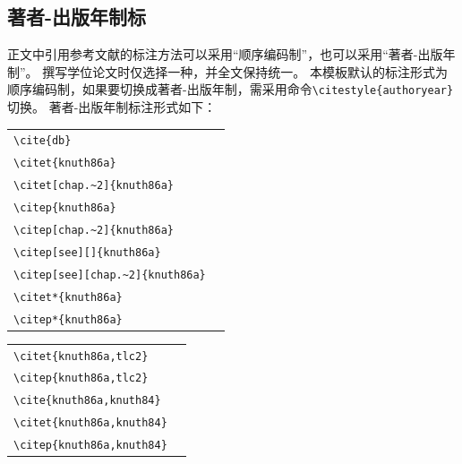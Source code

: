 \subsection{著者-出版年制标}
正文中引用参考文献的标注方法可以采用“顺序编码制”，也可以采用“著者-出版年制”。
撰写学位论文时仅选择一种，并全文保持统一。
本模板默认的标注形式为顺序编码制，如果要切换成著者-出版年制，需采用命令\verb|\citestyle{authoryear}|切换。
著者-出版年制标注形式如下：

\noindent
\begin{tabular}{l@{\quad$\Rightarrow$\quad}l}
  \verb|\cite{db}| & \cite{db}\\
  \verb|\citet{knuth86a}| & \citet{knuth86a}\\
  \verb|\citet[chap.~2]{knuth86a}| & \citet[chap.~2]{knuth86a}\\[0.5ex]
  \verb|\citep{knuth86a}| & \citep{knuth86a}\\
  \verb|\citep[chap.~2]{knuth86a}| & \citep[chap.~2]{knuth86a}\\
  \verb|\citep[see][]{knuth86a}| & \citep[see][]{knuth86a}\\
  \verb|\citep[see][chap.~2]{knuth86a}| & \citep[see][chap.~2]{knuth86a}\\[0.5ex]
  \verb|\citet*{knuth86a}| & \citet*{knuth86a}\\
  \verb|\citep*{knuth86a}| & \citep*{knuth86a}\\
\end{tabular}
\par\noindent
\begin{tabular}{l@{\quad$\Rightarrow$\quad}l}
  \verb|\citet{knuth86a,tlc2}| & \citet{knuth86a,tlc2}\\
  \verb|\citep{knuth86a,tlc2}| & \citep{knuth86a,tlc2}\\
  \verb|\cite{knuth86a,knuth84}| & \cite{knuth86a,knuth84}\\
  \verb|\citet{knuth86a,knuth84}| & \citet{knuth86a,knuth84}\\
  \verb|\citep{knuth86a,knuth84}| & \citep{knuth86a,knuth84}\\
\end{tabular}

